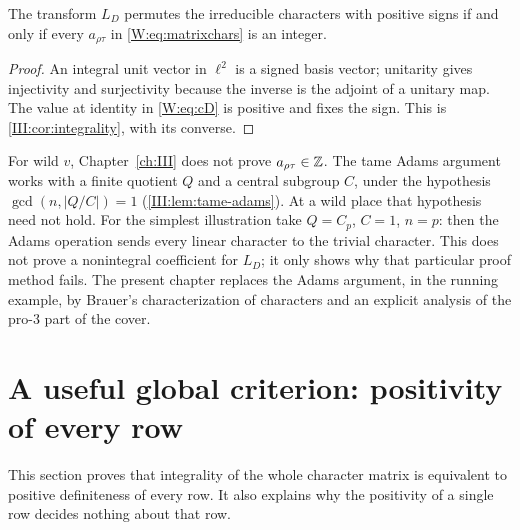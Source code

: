 \begin{proposition}\label{W:prop:int}
The transform $L_D$ permutes the irreducible characters with
positive signs if and only if every $a_{\rho\tau}$ in
\eqref{W:eq:matrixchars} is an integer.
\end{proposition}
\begin{proof}
An integral unit vector in $\ell^2$ is a signed basis vector;
unitarity gives injectivity and surjectivity because the inverse
is the adjoint of a unitary map.  The value at identity in
\eqref{W:eq:cD} is positive and fixes the sign.
This is \cref{III:cor:integrality}, with its converse.
\end{proof}

\begin{remark}
For wild $v$, Chapter~\ref{ch:III} does not prove
$a_{\rho\tau}\in\mathbb Z$.  The tame Adams argument works with a
finite quotient $Q$ and a central subgroup $C$, under the
hypothesis $\gcd(n,|Q/C|)=1$ (\cref{III:lem:tame-adams}).
At a wild place that hypothesis need not hold.  For the
simplest illustration take $Q=C_p$, $C=1$, $n=p$: then the
Adams operation sends every linear character to the trivial
character.  This does not prove a nonintegral coefficient for
$L_D$; it only shows why that particular proof method fails.
The present chapter replaces the Adams argument, in the running
example, by Brauer's characterization of characters and an
explicit analysis of the pro-$3$ part of the cover.
\end{remark}

\section{A useful global criterion: positivity of every row}\label{W:sec:positive}
This section proves that integrality of the whole character matrix is equivalent to positive definiteness of every row. It also explains why the positivity of a single row decides nothing about that row.

